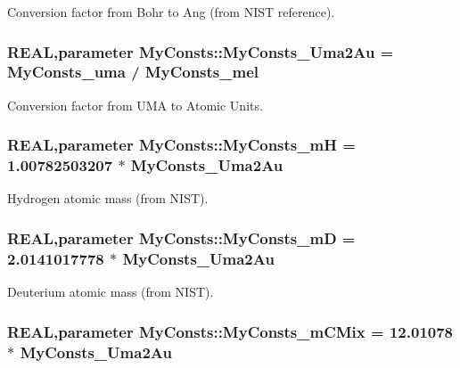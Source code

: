 Conversion factor from Bohr to Ang (from NIST reference). \hypertarget{namespace_my_consts_a36b4ba1dfa259ff5c9eaec55eb5f977f}{
\subsubsection[{MyConsts\_\-Uma2Au}]{\setlength{\rightskip}{0pt plus 5cm}REAL,parameter {\bf MyConsts::MyConsts\_\-Uma2Au} = {\bf MyConsts\_\-uma} / {\bf MyConsts\_\-mel}}}
\label{namespace_my_consts_a36b4ba1dfa259ff5c9eaec55eb5f977f}


Conversion factor from UMA to Atomic Units. \hypertarget{namespace_my_consts_a6f63ce440e87b3a56e3497bfa4f8fe89}{
\subsubsection[{MyConsts\_\-mH}]{\setlength{\rightskip}{0pt plus 5cm}REAL,parameter {\bf MyConsts::MyConsts\_\-mH} = 1.00782503207 $\ast$ {\bf MyConsts\_\-Uma2Au}}}
\label{namespace_my_consts_a6f63ce440e87b3a56e3497bfa4f8fe89}


Hydrogen atomic mass (from NIST). \hypertarget{namespace_my_consts_a1f26a10350f900a32cfaac2147965359}{
\subsubsection[{MyConsts\_\-mD}]{\setlength{\rightskip}{0pt plus 5cm}REAL,parameter {\bf MyConsts::MyConsts\_\-mD} = 2.0141017778 $\ast$ {\bf MyConsts\_\-Uma2Au}}}
\label{namespace_my_consts_a1f26a10350f900a32cfaac2147965359}


Deuterium atomic mass (from NIST). \hypertarget{namespace_my_consts_a0e6de90a68dfbeb30ff2510d3a0f4f33}{
\subsubsection[{MyConsts\_\-mCMix}]{\setlength{\rightskip}{0pt plus 5cm}REAL,parameter {\bf MyConsts::MyConsts\_\-mCMix} = 12.01078 $\ast$ {\bf MyConsts\_\-Uma2Au}}}
\label{namespace_my_consts_a0e6de90a68dfbeb30ff2510d3a0f4f33}


